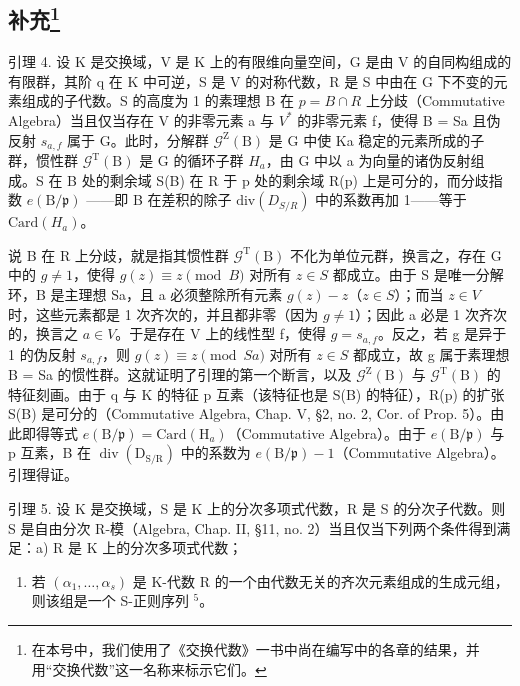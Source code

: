 \subsection[补充]{补充\footnote{在本号中，我们使用了《交换代数》一书中尚在编写中的各章的结果，并用“交换代数”这一名称来标示它们。}}

引理 4. 设 K 是交换域，V 是 K 上的有限维向量空间，G 是由 V 的自同构组成的有限群，其阶 q 在 K 中可逆，S 是 V 的对称代数，R 是 S 中由在 G 下不变的元素组成的子代数。S 的高度为 1 的素理想 B 在 \(p = B \cap R\) 上分歧（Commutative Algebra）当且仅当存在 V 的非零元素 a 与 \(V^{*}\) 的非零元素 f，使得 B = Sa 且伪反射 \(s_{a,f}\) 属于 G。此时，分解群 \(\mathcal{G}^{\mathrm{Z}}(\mathrm{B})\) 是 G 中使 Ka 稳定的元素所成的子群，惯性群 \(\mathcal{G}^{\mathrm{T}}(\mathrm{B})\) 是 G 的循环子群 \(H_{a}\)，由 G 中以 a 为向量的诸伪反射组成。S 在 B 处的剩余域 S(B) 在 R 于 p 处的剩余域 R(p) 上是可分的，而分歧指数 \(e(\mathrm{B}/\mathfrak{p})\) ——即 B 在差积的除子 \(\text{div}(D_{S/R})\) 中的系数再加 1——等于 \(\text{Card}(H_{a})\)。

说 B 在 R 上分歧，就是指其惯性群 \(\mathcal{G}^{\mathrm{T}}(\mathrm{B})\) 不化为单位元群，换言之，存在 G 中的 \(g \neq 1\)，使得 \(g(z) \equiv z \pmod{B}\) 对所有 \(z \in S\) 都成立。由于 S 是唯一分解环，B 是主理想 Sa，且 a 必须整除所有元素 \(g(z) - z\)（\(z \in S\)）；而当 \(z \in V\) 时，这些元素都是 1 次齐次的，并且都非零（因为 \(g \neq 1\)）；因此 a 必是 1 次齐次的，换言之 \(a \in V\)。于是存在 V 上的线性型 f，使得 \(g = s_{a,f}\)。反之，若 g 是异于 1 的伪反射 \(s_{a,f}\)，则 \(g(z) \equiv z \pmod{Sa}\) 对所有 \(z \in S\) 都成立，故 g 属于素理想 B = Sa 的惯性群。这就证明了引理的第一个断言，以及 \(\mathcal{G}^{\mathrm{Z}}(\mathrm{B})\) 与 \(\mathcal{G}^{\mathrm{T}}(\mathrm{B})\) 的特征刻画。由于 q 与 K 的特征 p 互素（该特征也是 S(B) 的特征），R(p) 的扩张 S(B) 是可分的（Commutative Algebra, Chap. V, §2, no. 2, Cor. of Prop. 5）。由此即得等式 \(e(\mathrm{B}/\mathfrak{p}) = \mathrm{Card}(\mathrm{H}_{a})\)（Commutative Algebra）。由于 \(e(\mathrm{B}/\mathfrak{p})\) 与 p 互素，B 在 \(\operatorname{div}(\mathrm{D}_{\mathrm{S/R}})\) 中的系数为 \(e(\mathrm{B}/\mathfrak{p}) - 1\)（Commutative Algebra）。引理得证。

引理 5. 设 K 是交换域，S 是 K 上的分次多项式代数，R 是 S 的分次子代数。则 S 是自由分次 R-模（Algebra, Chap. II, §11, no. 2）当且仅当下列两个条件得到满足：a) R 是 K 上的分次多项式代数；

\begin{enumerate}
\def\labelenumi{\alph{enumi})}
\setcounter{enumi}{1}
\tightlist
\item
  若 \((\alpha_{1},\ldots,\alpha_{s})\) 是 K-代数 R 的一个由代数无关的齐次元素组成的生成元组，则该组是一个 S-正则序列 \(^{5}\)。
\end{enumerate}


